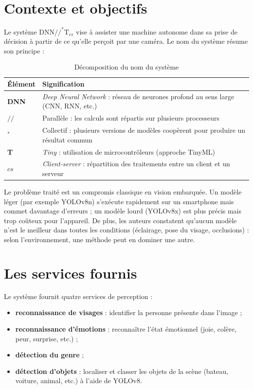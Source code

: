 \documentclass[11pt,a4paper]{report}
\newcommand{\dnnTcs}{\ensuremath{\mathrm{DNN}/\!/^{*}\mathrm{T}_{cs}}}
\begin{document}
\section{Contexte et objectifs}

Le système \dnnTcs{} vise à assister une machine autonome dans sa prise de décision à partir de ce qu'elle perçoit par une caméra. Le nom du système résume son principe :

\begin{table}[H]
\centering
\caption{Décomposition du nom du système}
\label{tab:nom}
\begin{tabularx}{0.85\textwidth}{>{\bfseries}l L}
\toprule
{}\textbf{Élément} & \textbf{Signification}\\
\midrule
DNN & \emph{Deep Neural Network} : réseau de neurones profond au sens large (CNN, RNN, etc.)\\
$/\!/$ & Parallèle : les calculs sont répartis sur plusieurs processeurs\\
$^{*}$ & Collectif : plusieurs versions de modèles coopèrent pour produire un résultat commun\\
T & \emph{Tiny} : utilisation de microcontrôleurs (approche TinyML)\\
$cs$ & \emph{Client-server} : répartition des traitements entre un client et un serveur\\
\bottomrule
\end{tabularx}
\end{table}

Le problème traité est un compromis classique en vision embarquée. Un modèle léger (par exemple YOLOv8n) s'exécute rapidement sur un smartphone mais commet davantage d'erreurs ; un modèle lourd (YOLOv8x) est plus précis mais trop coûteux pour l'appareil. De plus, les auteurs constatent qu'aucun modèle n'est le meilleur dans toutes les conditions (éclairage, pose du visage, occlusions) : selon l'environnement, une méthode peut en dominer une autre.

\section{Les services fournis}

Le système fournit quatre services de perception :
\begin{itemize}
  \item \textbf{reconnaissance de visages} : identifier la personne présente dans l'image ;
  \item \textbf{reconnaissance d'émotions} : reconnaître l'état émotionnel (joie, colère, peur, surprise, etc.) ;
  \item \textbf{détection du genre} ;
  \item \textbf{détection d'objets} : localiser et classer les objets de la scène (bateau, voiture, animal, etc.) à l'aide de YOLOv8.
\end{itemize}
\end{document}

